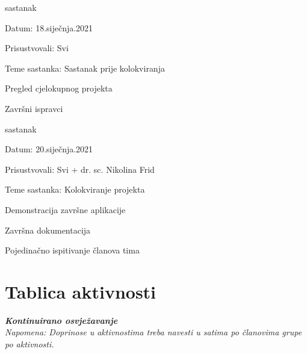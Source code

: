 \begin{packed_enum}
				\item  sastanak
			\item[] \begin{packed_item}
				\item Datum: 18.siječnja.2021
				\item Prisustvovali: Svi
				\item Teme sastanka: Sastanak prije kolokviranja
				\begin{packed_item}
				    \item Pregled cjelokupnog projekta
					\item Završni ispravci
				\end{packed_item}
			\end{packed_item}
			
			
			\item  sastanak
			\item[] \begin{packed_item}
				\item Datum: 20.siječnja.2021
				\item Prisustvovali: Svi + dr. sc. Nikolina Frid
				\item Teme sastanka: Kolokviranje projekta
				\begin{packed_item}
                    \item Demonstracija završne aplikacije
                    \item Završna dokumentacija
                    \item Pojedinačno ispitivanje članova tima
				\end{packed_item}
			\end{packed_item}
			
			
			
			
		\end{packed_enum}
		\eject
		\section*{Tablica aktivnosti}
		
			\textbf{\textit{Kontinuirano osvježavanje}}\\
			
			 \textit{Napomena: Doprinose u aktivnostima treba navesti u satima po članovima grupe po aktivnosti.}
					
						
			

